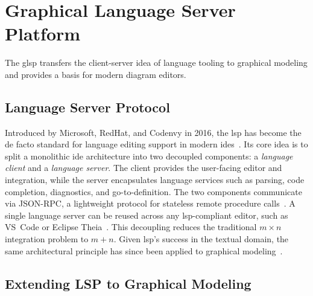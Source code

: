 \section{Graphical Language Server Platform}
\label{sec:bg_glsp}

The \gls{glsp} transfers the client-server idea of language tooling to graphical modeling and provides a basis for modern diagram editors.

\subsection{Language Server Protocol}
\label{subsec:bg_glsp_lsp}

Introduced by Microsoft, RedHat, and Codenvy in 2016, the \gls{lsp} has become the de facto standard for language editing support in modern \glspl{ide}~\cite{bunder_decoupling_2019}.
Its core idea is to split a monolithic \gls{ide} architecture into two decoupled components: a \textit{language client} and a \textit{language server}.
The client provides the user-facing editor and integration, while the server encapsulates language services such as parsing, code completion, diagnostics, and go-to-definition.
The two components communicate via JSON-RPC, a lightweight protocol for stateless remote procedure calls~\cite{bunder_decoupling_2019, bork_vision_2024}.
A single language server can be reused across any \gls{lsp}-compliant editor, such as VS~Code or Eclipse Theia~\cite{bunder_decoupling_2019}.
This decoupling reduces the traditional $m \times n$ integration problem to $m + n$.
Given \gls{lsp}'s success in the textual domain, the same architectural principle has since been applied to graphical modeling~\cite{bork_vision_2024, rodriguez-echeverria_towards_2018}.

\subsection{Extending LSP to Graphical Modeling}
\label{subsec:bg_glsp_evolution}

